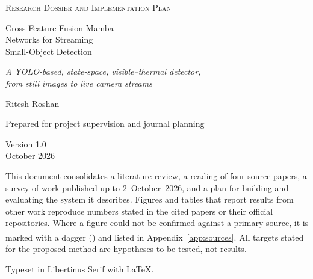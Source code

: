 \begin{titlepage}
\thispagestyle{empty}
\centering

\vspace*{30mm}

{\large\scshape\color{muted} Research Dossier and Implementation Plan\par}

\vspace{20mm}

{\fontsize{29}{37}\selectfont Cross-Feature Fusion Mamba\\[2pt]
 Networks for Streaming\\[2pt]
 Small-Object Detection\par}

\vspace{14mm}

{\Large\itshape A YOLO-based, state-space, visible--thermal detector,\\[2pt]
 from still images to live camera streams\par}

\vspace{30mm}

{\large Ritesh Roshan\par}

\vspace{4mm}

{\normalsize\color{muted} Prepared for project supervision and journal planning\par}

\vfill

{\normalsize\color{muted}
Version 1.0\\[2pt]
October 2026\par}

\vspace{12mm}
\end{titlepage}

\thispagestyle{empty}
\vspace*{\fill}
\begin{minipage}{\textwidth}
\small\color{muted}
This document consolidates a literature review, a reading of four source
papers, a survey of work published up to 2~October~2026, and a plan for
building and evaluating the system it describes. Figures and tables
that report results from other work reproduce numbers stated in the
cited papers or their official repositories. Where a figure could not be
confirmed against a primary source, it is marked with a dagger
(\textsuperscript{\dag}) and listed in Appendix~\ref{app:sources}. All
targets stated for the proposed method are hypotheses to be tested, not
results.

\vspace{6mm}

Typeset in Libertinus Serif with \LaTeX.
\end{minipage}
\vspace{18mm}
\clearpage
